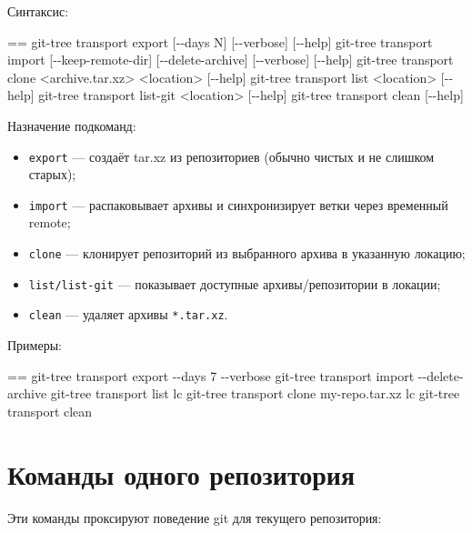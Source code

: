 \documentclass{book}
\makeatletter
\newenvironment{Texinfopreformatted}{%
  \par\GNUTobeylines\obeyspaces\frenchspacing\parskip=\z@\parindent=\z@}{}
{\catcode`\^^M=13 \gdef\GNUTobeylines{\catcode`\^^M=13 \def^^M{\null\par}}}
\newenvironment{Texinfoindented}{\begin{list}{}{}\item\relax}{\end{list}}
\renewcommand{\_}{\Texinfounderscore\discretionary{}{}{}}
\makeatother
\begin{document}
Синтаксис:
\begin{Texinfoindented}
\begin{Texinfopreformatted}%
\ttfamily git-tree transport export [{-}{-}days N] [{-}{-}verbose] [{-}{-}help]
git-tree transport import [{-}{-}keep-remote-dir] [{-}{-}delete-archive] [{-}{-}verbose] [{-}{-}help]
git-tree transport clone <archive.tar.xz> <location> [{-}{-}help]
git-tree transport list <location> [{-}{-}help]
git-tree transport list-git <location> [{-}{-}help]
git-tree transport clean [{-}{-}help]
\end{Texinfopreformatted}
\end{Texinfoindented}

Назначение подкоманд:
\begin{itemize}[label=\textbullet{}]
\item \texttt{export} — создаёт tar.xz из репозиториев (обычно чистых и не слишком старых);
\item \texttt{import} — распаковывает архивы и синхронизирует ветки через временный remote;
\item \texttt{clone} — клонирует репозиторий из выбранного архива в указанную локацию;
\item \texttt{list/list-git} — показывает доступные архивы/репозитории в локации;
\item \texttt{clean} — удаляет архивы \texttt{*.tar.xz}.
\end{itemize}

Примеры:
\begin{Texinfoindented}
\begin{Texinfopreformatted}%
\ttfamily git-tree transport export {-}{-}days 7 {-}{-}verbose
git-tree transport import {-}{-}delete-archive
git-tree transport list lc
git-tree transport clone my-repo.tar.xz lc
git-tree transport clean
\end{Texinfopreformatted}
\end{Texinfoindented}

\chapter{{Команды одного репозитория}}
\label{anchor:_041a_043e_043c_0430_043d_0434_044b-_043e_0434_043d_043e_0433_043e-_0440_0435_043f_043e_0437_0438_0442_043e_0440_0438_044f}%

Эти команды проксируют поведение git для текущего репозитория:
\end{document}
